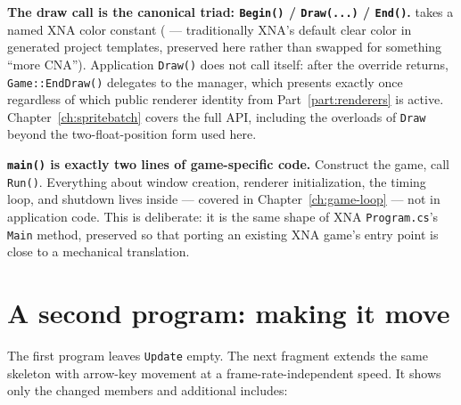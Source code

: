 \textbf{The draw call is the canonical  triad:
\texttt{Begin()} / \texttt{Draw(...)} / \texttt{End()}.}  takes a
named XNA color constant ( --- traditionally XNA's default
clear color in generated project templates, preserved here rather than swapped for something
``more CNA''). Application \texttt{Draw()} does not call 
itself: after the override returns, \texttt{Game::EndDraw()} delegates to the manager, which
presents exactly once regardless of which public renderer identity from
Part~\ref{part:renderers} is active.
Chapter~\ref{ch:spritebatch} covers the full  API, including the
overloads of \texttt{Draw} beyond the two-float-position form used here.

\textbf{\texttt{main()} is exactly two lines of game-specific code.} Construct the game,
call \texttt{Run()}. Everything about window creation, renderer initialization, the timing
loop, and shutdown lives inside  --- covered in
Chapter~\ref{ch:game-loop} --- not in application code. This is deliberate: it is the same
shape of XNA \texttt{Program.cs}'s \texttt{Main} method, preserved so that porting an
existing XNA game's entry point is close to a mechanical translation.

\section{A second program: making it move}
\label{sec:first-game-movement}

The first program leaves \texttt{Update} empty. The next fragment extends the same skeleton with
arrow-key movement at a frame-rate-independent speed. It shows only the changed members and
additional includes:

